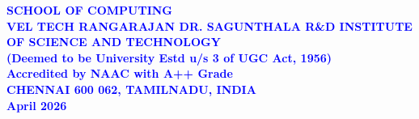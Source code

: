 \documentclass[10pt,openany]{report}
\begin{document}
\begin{center}
\large{\textbf{\textcolor{blue}{SCHOOL OF COMPUTING}}}\\
\vspace{0.5cm}
\Large{\textbf{\textcolor{blue}{VEL TECH RANGARAJAN DR. SAGUNTHALA R\&D INSTITUTE OF
SCIENCE AND TECHNOLOGY\\
\vspace{0.2cm}
(Deemed to be University Estd u/s 3 of UGC Act,
1956)}}}\\\Large{\textbf{\textcolor{blue}{Accredited by NAAC with A++ Grade}}}\\
\large{\textbf{\textcolor{blue}{CHENNAI 600 062, TAMILNADU, INDIA}}}
\vspace{0.4cm}
\large{\textbf{\textcolor{blue}{\\April 2026}}}\\
\end{center}
\end{document}
